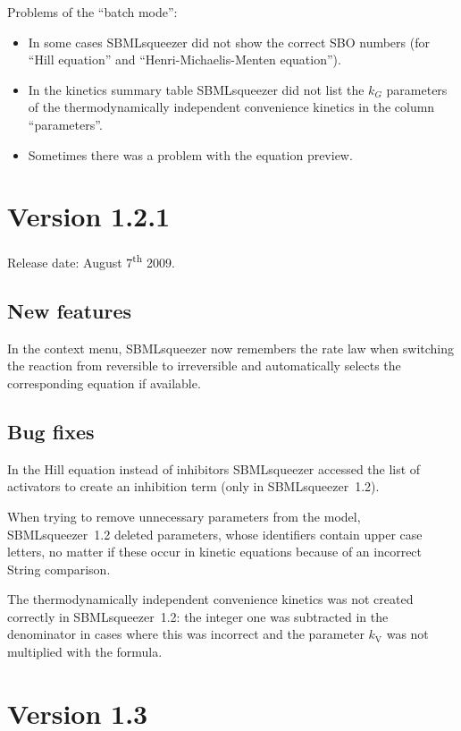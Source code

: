 Problems of the ``batch mode'':
\begin{itemize}
\item In some cases SBMLsqueezer did not show the correct SBO numbers (for 
      ``Hill equation'' and ``Henri-Michaelis-Menten equation'').
\item In the kinetics summary table SBMLsqueezer did not list the $k_G$
      parameters of the thermodynamically independent convenience kinetics in
      the column ``parameters''.
\item Sometimes there was a problem with the equation preview.
\end{itemize}


\section{Version 1.2.1}

Release date: August 7\textsuperscript{th} 2009.

\subsection{New features}

In the context menu, SBMLsqueezer now remembers the rate law when switching the
reaction from reversible to irreversible and automatically selects the
corresponding equation if available.

\subsection{Bug fixes}

In the Hill equation instead of inhibitors SBMLsqueezer accessed the list of
activators to create an inhibition term (only in SBMLsqueezer~1.2).

When trying to remove unnecessary parameters from the model, SBMLsqueezer~1.2
deleted parameters, whose identifiers contain upper case letters, no matter if
these occur in kinetic equations because of an incorrect String comparison.

The thermodynamically independent convenience kinetics was not created correctly
in SBMLsqueezer~1.2: the integer one was subtracted in the denominator in cases
where this was incorrect and the parameter $k_\mathrm{V}$ was not multiplied with the
formula.


\section{Version 1.3}

